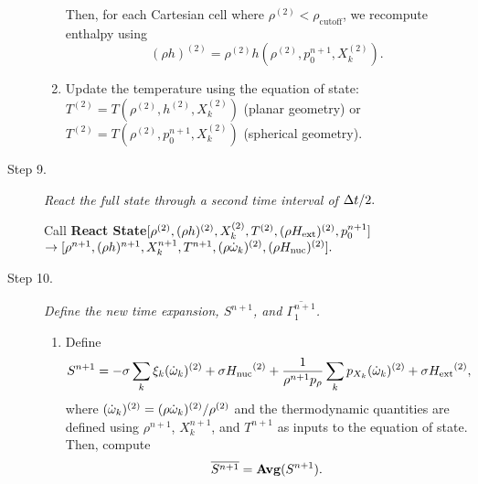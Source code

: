 \begin{description}
\begin{enumerate}
\begin{enumerate}
\end{enumerate}

Then, for each Cartesian cell where $\rho^{(2)} < \rho_\mathrm{cutoff}$, we recompute enthalpy using
\begin{equation}
(\rho h)^{(2)} = \rho^{(2)}h\left(\rho^{(2)},p_0^{n+1},X_k^{(2)}\right).
\end{equation}

\item Update the temperature using the equation of state:
$T^{(2)} = 
   T(\rho^{(2)}, h^{(2)}, X_k^{(2)})$ (planar geometry) or
$T^{(2)} = 
   T(\rho^{(2)}, p_0^{n+1}, X_k^{(2)})$ (spherical geometry).
\end{enumerate}

\item[Step 9.] {\em React the full state through a second time interval of $\Delta t / 2.$}

Call {\bf React State}$[\rho^{(2)},(\rho h)^{(2)}, X_k^{(2)},T^{(2)}, (\rho{H_{\rm ext}})^{(2)}, p_0^{n+1}]$\\
\phantom{ }\hfill$\rightarrow [\rho^{n+1}, (\rho h)^{n+1}, X_k^{n+1}, T^{n+1}, (\rho \dot{\omega}_k)^{(2)}, (\rho {H_{\rm nuc}})^{(2)} ].$  

\item[Step 10.] {\em Define the new time expansion, $S^{n+1}$, and $\overline{\Gamma_1^{n+1}}$.}

\begin{enumerate}
\renewcommand{\theenumi}{{\bf \Alph{enumi}}}
\item Define
\begin{equation}
  S^{n+1} =  -\sigma  \sum_k  \xi_k (\dot{\omega}_k)^{(2)}  + \sigma {H_{\rm nuc}}^{(2)} +
  \frac{1}{\rho^{n+1} p_\rho} \sum_k p_{X_k}  ({\dot{\omega}}_k)^{(2)}  
   + \sigma {H_{\rm ext}}^{(2)},
\end{equation}
where $(\dot{\omega}_k)^{(2)} = (\rho \dot{\omega}_k)^{(2)} / \rho^{(2)}$
and the thermodynamic quantities are defined using $\rho^{n+1}$,
$X_k^{n+1}$, and $T^{n+1}$ as inputs to the equation of state.
Then, compute
\begin{equation}
\overline{S^{n+1}} = {\mathrm{\bf Avg}} (S^{n+1}).
\end{equation}


\end{enumerate}
\end{description}
